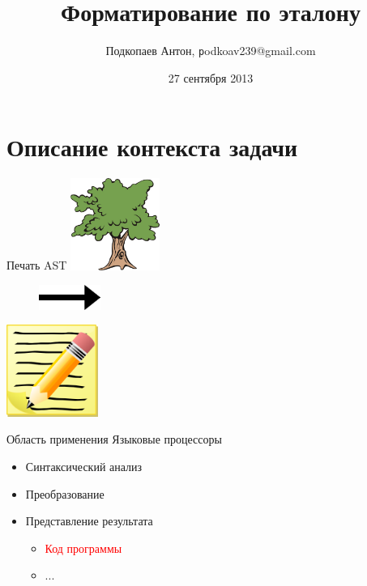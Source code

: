 \documentclass[sans]{beamer}
\begin{document}
\title[Форматирование по эталону] {Форматирование по эталону}



\author
[Подкопаев Антон]{Подкопаев Антон, \texttt podkoav239@gmail.com}
\date [27-09-13]{27 сентября 2013}

\begin{frame}[plain]
	\titlepage
\end{frame}

\section{Описание контекста задачи}

\begin{frame}{Печать AST}
	\includegraphics[height = 3cm]{images/tree.jpg}
	\begin{figure}
		\includegraphics[width = 2cm]{images/arrow.png}
	\end{figure}

	\hfill
	\includegraphics[height = 3cm]{images/text.png}
\end{frame}

\begin{frame}{Область применения}
	Языковые процессоры
	\begin{itemize}
		\item Синтаксический анализ
		\item Преобразование
		\item Представление результата
		\begin{itemize}
			\item \textcolor{red}{Код программы}
			\item ...
		\end{itemize}
	\end{itemize}
\end{frame}
\end{document}
